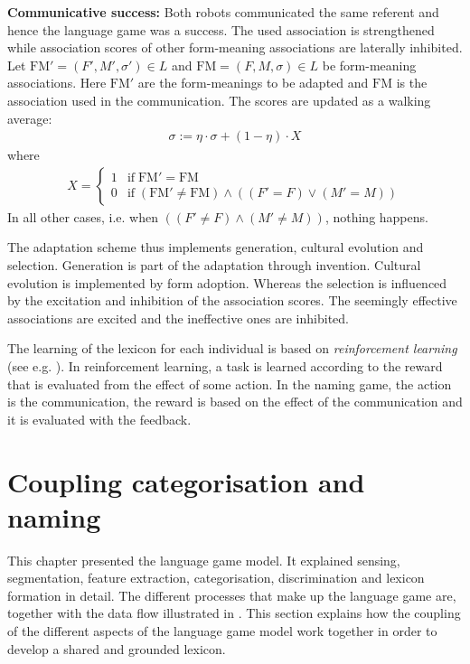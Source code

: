 \begin{description}
\item {\bf Communicative success:} Both robots communicated the same referent and hence the language game was a success. The used association is strengthened while association scores of other form-meaning associations are laterally inhibited. Let $\mbox{FM}' = (F',M',\sigma') \in L$ and $\mbox{FM} = (F,M,\sigma) \in L$ be form-meaning associations. Here $\mbox{FM}'$ are the form-meanings to be adapted and $\mbox{FM}$ is the association used in the communication. The scores are updated as a walking average:
\begin{eqnarray}
\sigma := \eta \cdot \sigma + (1 - \eta) \cdot X
\label{e:cm:adapt2}
\end{eqnarray}
where
\begin{eqnarray}
X = \left \{ \begin{array}{rl} 1 & \mbox{if}\; \mbox{FM}' = \mbox{FM} \nonumber\\
0 & \mbox{if}\; (\mbox{FM}' \neq \mbox{FM}) \wedge ((F' = F) \vee (M' = M))\nonumber \end{array} \right.
\end{eqnarray}
In all other cases, i.e. when $((F' \neq F)\wedge (M' \neq M))$, nothing happens.
\end{description}

The adaptation scheme thus implements generation, cultural evolution and selection. Generation is part of the adaptation through invention. Cultural evolution is implemented by form adoption. Whereas the selection is influenced by the excitation and inhibition of the association scores. The seemingly effective associations are excited and the ineffective ones are inhibited.

The learning of the lexicon for each individual is based on {\em reinforcement learning} (see e.g. \citealt{suttonbarto:1998}). In reinforcement learning, a task is learned according to the reward that is evaluated from the effect of some action. In the naming game, the action is the communication, the reward is based on the effect of the communication and it is evaluated with the feedback. 

\section{Coupling categorisation and naming}\label{s:coupling}

This chapter presented the language game model. It explained sensing, segmentation, feature extraction, categorisation, discrimination and lexicon formation in detail. The different processes that make up the language game are, together with the data flow illustrated in . This section explains how the coupling of the different aspects of the language game model work together in order to develop a shared and grounded lexicon.

